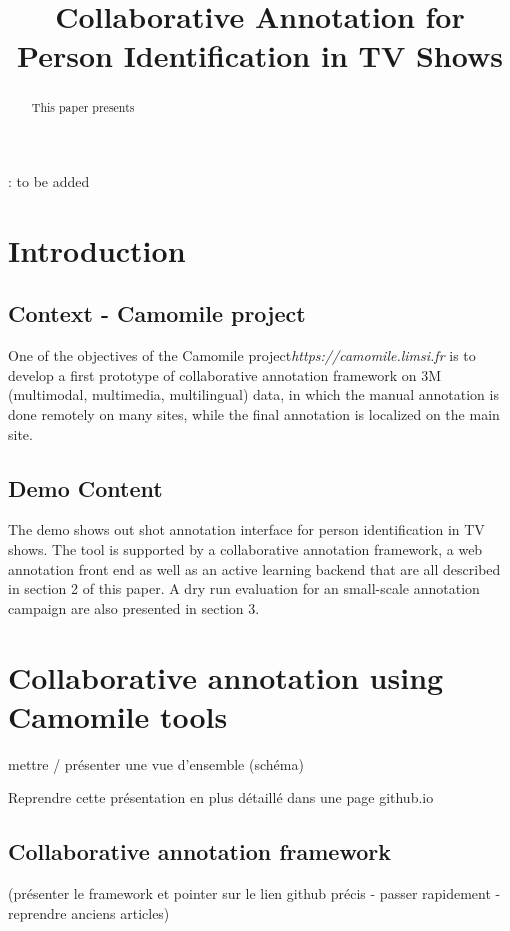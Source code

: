\documentclass[a4paper]{article}
\title{Collaborative Annotation for Person Identification in TV Shows}
\begin{document}
  \maketitle
  \begin{abstract}
This paper presents 
  \end{abstract}
  : to be added

  \section{Introduction}
      \subsection{Context - Camomile project}
One of the objectives of the Camomile project\textit{https://camomile.limsi.fr} is to develop a first prototype of collaborative annotation framework on 3M (multimodal, multimedia, multilingual) data, in which the manual annotation is done remotely on many sites, while the final annotation is localized on the main site. 


 \subsection{Demo Content}
The demo shows out shot annotation interface for person identification in TV shows. The tool is supported by a collaborative annotation framework, a web annotation front end as well as an active learning backend that are all described in section 2 of this paper. A dry run evaluation for an small-scale annotation campaign are also presented in section 3.


      \section{Collaborative annotation using Camomile tools}

mettre / présenter une vue d'ensemble (schéma) 

Reprendre cette présentation en plus détaillé dans une page github.io 


      \subsection{Collaborative annotation framework}
(présenter le framework et pointer sur le lien github précis - passer rapidement - reprendre anciens articles)
\end{document}
